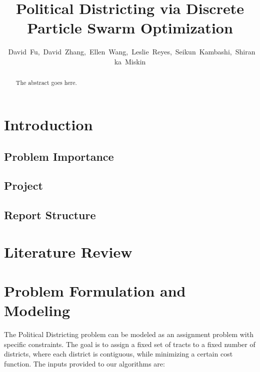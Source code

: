 \documentclass[journal]{IEEEtran}
\begin{document}
\title{Political Districting via Discrete Particle Swarm Optimization}
\author{~David~Fu,~David~Zhang,~Ellen~Wang,~Leslie~Reyes,~Seikun~Kambashi,~Shiranka~Miskin}
\maketitle

\begin{abstract}
The abstract goes here.
\end{abstract}

\section{Introduction}
\subsection{Problem Importance}

\subsection{Project}

\subsection{Report Structure}

\section{Literature Review}

\section{Problem Formulation and Modeling}
The Political Districting problem can be modeled as an assignment problem with
specific constraints.  The goal is to assign a fixed set of tracts to a fixed
number of districts, where each district is contiguous, while minimizing a
certain cost function.  The inputs provided to our algorithms are:
\end{document}
